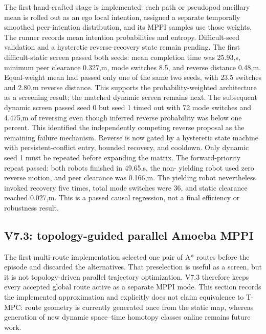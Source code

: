 \documentclass[11pt,a4paper]{article}
\newcommand{\code}[1]{\texttt{\detokenize{#1}}}
\begin{document}
The first hand-crafted stage is implemented: each path or pseudopod ancillary
mean is rolled out as an ego local intention, assigned a separate temporally
smoothed peer-intention distribution, and its MPPI samples use those weights.
The runner records mean intention probabilities and entropy. Difficult-seed
validation and a hysteretic reverse-recovery state remain pending. The first
difficult-static screen passed both seeds: mean completion time was 25.93,s,
minimum peer clearance 0.327,m, mode switches 8.5, and reverse distance
0.48,m. Equal-weight mean had passed only one of the same two seeds, with 23.5
switches and 2.80,m reverse distance. This supports the probability-weighted
architecture as a screening result; the matched dynamic screen remains next.
The subsequent dynamic screen passed seed 0 but seed 1 timed out with 72 mode
switches and 4.475,m of reversing even though inferred reverse probability was
below one percent. This identified the independently competing reverse
proposal as the remaining failure mechanism. Reverse is now gated by a
hysteretic \code{NORMAL/YIELD/RECOVERY\_REVERSE/REJOIN} state machine with
persistent-conflict entry, bounded recovery, and cooldown. Only dynamic seed 1
must be repeated before expanding the matrix.
The forward-priority repeat passed: both robots finished in 49.65,s, the non-
yielding robot used zero reverse motion, and peer clearance was 0.166,m. The
yielding robot nevertheless invoked recovery five times, total mode switches
were 36, and static clearance reached 0.027,m. This is a passed causal
regression, not a final efficiency or robustness result.

\subsection{V7.3: topology-guided parallel Amoeba MPPI}

The first multi-route implementation selected one pair of A* routes before
the episode and discarded the alternatives. That preselection is useful as a
screen, but it is not topology-driven parallel trajectory optimization. V7.3
therefore keeps every accepted global route active as a separate MPPI mode.
This section records the implemented approximation and explicitly does not
claim equivalence to T-MPC: route geometry is currently generated once from
the static map, whereas generation of new dynamic space--time homotopy classes
online remains future work.
\end{document}
